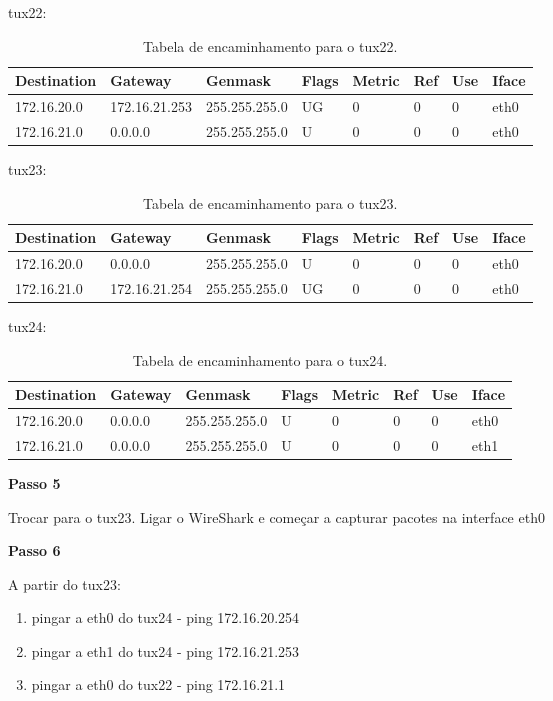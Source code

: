 tux22:
\begin{table}[h]
    \centering
    \begin{tabular}{|l|l|l|l|l|l|l|l|}
    \hline
        Destination & Gateway & Genmask & Flags & Metric & Ref & Use & Iface \\ \hline
        172.16.20.0 & 172.16.21.253 & 255.255.255.0 & UG & 0 & 0 & 0 & eth0 \\ \hline
        172.16.21.0 & 0.0.0.0 & 255.255.255.0 & U & 0 & 0 & 0 & eth0 \\ \hline
    \end{tabular}
    \caption{\label{tab:table-name}Tabela de encaminhamento para o tux22.}
\end{table}

tux23:
\begin{table}[h]
    \centering
    \begin{tabular}{|l|l|l|l|l|l|l|l|}
    \hline
        Destination & Gateway & Genmask & Flags & Metric & Ref & Use & Iface \\ \hline
        172.16.20.0 & 0.0.0.0 & 255.255.255.0 & U & 0 & 0 & 0 & eth0 \\ \hline
        172.16.21.0 & 172.16.21.254 & 255.255.255.0 & UG & 0 & 0 & 0 & eth0 \\ \hline
    \end{tabular}
    \caption{\label{tab:table-name}Tabela de encaminhamento para o tux23.}
\end{table}

tux24:
\begin{table}[h]
    \centering
    \begin{tabular}{|l|l|l|l|l|l|l|l|}
    \hline
        Destination & Gateway & Genmask & Flags & Metric & Ref & Use & Iface \\ \hline
        172.16.20.0 & 0.0.0.0 & 255.255.255.0 & U & 0 & 0 & 0 & eth0 \\ \hline
        172.16.21.0 & 0.0.0.0 & 255.255.255.0 & U & 0 & 0 & 0 & eth1 \\ \hline
    \end{tabular}
    \caption{\label{tab:table-name}Tabela de encaminhamento para o tux24.}
\end{table}

\textbf{Passo 5}

Trocar para o tux23. Ligar o WireShark e começar a capturar pacotes na interface eth0

\textbf{Passo 6}

A partir do tux23:
\begin{enumerate}
  \item pingar a eth0 do tux24 - ping 172.16.20.254
  \item pingar a eth1 do tux24 - ping 172.16.21.253
  \item pingar a eth0 do tux22 - ping 172.16.21.1
\end{enumerate}

